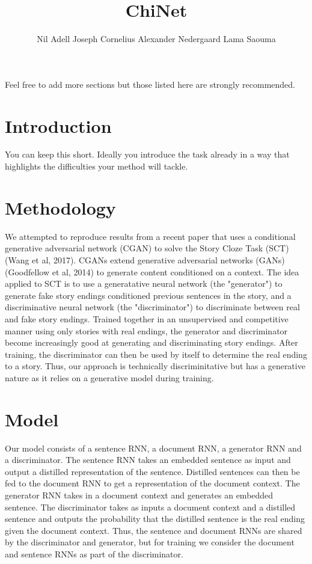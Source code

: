 \documentclass{article}
\title{ChiNet}
\author{Nil Adell \qquad Joseph Cornelius \qquad Alexander Nedergaard \qquad Lama Saouma}
\begin{document}

\maketitle


Feel free to add more sections but those listed here are strongly recommended.
\section{Introduction}
You can keep this short. Ideally you introduce the task already in a way that highlights the difficulties  your method will tackle. \\
\section{Methodology}
We attempted to reproduce results from a recent paper that uses a conditional generative adversarial network (CGAN) to solve the Story Cloze Task (SCT) (Wang et al, 2017). CGANs extend generative adversarial networks (GANs) (Goodfellow et al, 2014) to generate content conditioned on a context. The idea applied to SCT is to use a generatative neural network (the "generator") to generate fake story endings conditioned previous sentences in the story, and a discriminative neural network (the "discriminator") to discriminate between real and fake story endings. Trained together in an unsupervised and competitive manner using only stories with real endings, the generator and discriminator become increasingly good at generating and discriminating story endings. After training, the discriminator can then be used by itself to determine the real ending to a story. Thus, our approach is technically discriminitative but has a generative nature as it relies on a generative model during training.
\section{Model}
Our model consists of a sentence RNN, a document RNN, a generator RNN and a discriminator. The sentence RNN takes an embedded sentence as input and output a distilled representation of the sentence. Distilled sentences can then be fed to the document RNN to get a representation of the document context. The generator RNN takes in a document context and generates an embedded sentence. The discriminator takes as inputs a document context and a distilled sentence and outputs the probability that the distilled sentence is the real ending given the document context. Thus, the sentence and document RNNs are shared by the discriminator and generator, but for training we consider the document and sentence RNNs as part of the discriminator.
\end{document}
